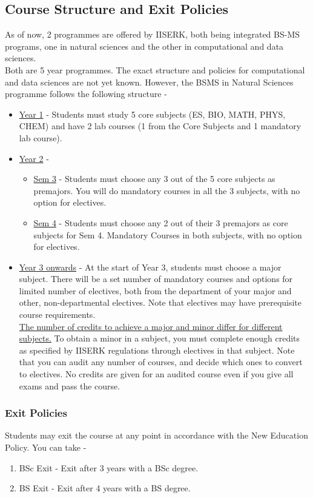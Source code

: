 \documentclass[openany]{book}
\begin{document}
\subsection{Course Structure and Exit Policies}
As of now, 2 programmes are offered by IISERK, both being integrated BS-MS programs, one in natural sciences and the other in computational and data sciences. \\
Both are 5 year programmes. The exact structure and policies for computational and data sciences are not yet known. However, the BSMS in Natural Sciences programme follows the following structure - 
\begin{itemize}
    \item \underline{Year 1} - Students must study 5 core subjects (ES, BIO, MATH, PHYS, CHEM) and have 2 lab courses (1 from the Core Subjects and 1 mandatory lab course).
    \item \underline{Year 2} - 
    \begin{itemize}
        \item \underline{Sem 3} - Students must choose any 3 out of the 5 core subjects as premajors. You will do mandatory courses in all the 3 subjects, with no option for electives. 
        \item \underline{Sem 4} - Students must choose any 2 out of their 3 premajors as core subjects for Sem 4. Mandatory Courses in both subjects, with no option for electives. 
    \end{itemize}
    \item \underline{Year 3 onwards} - At the start of Year 3, students must choose a major subject. There will be a set number of mandatory courses and options for limited number of electives, both from the department of your major and other, non-departmental electives. Note that electives may have prerequisite course requirements. \\
    \underline{The number of credits to achieve a major and minor differ for different subjects.}
    To obtain a minor in a subject, you must complete enough credits as specified by IISERK regulations through electives in that subject. Note that you can audit any number of courses, and decide which ones to convert to electives. No credits are given for an audited course even if you give all exams and pass the course. 
\end{itemize}
\subsubsection{Exit Policies}
Students may exit the course at any point in accordance with the New Education Policy. You can take - 
\begin{enumerate}
    \item BSc Exit - Exit after 3 years with a BSc degree. 
    \item BS Exit - Exit after 4 years with a BS degree. 
\end{enumerate}
\end{document}
